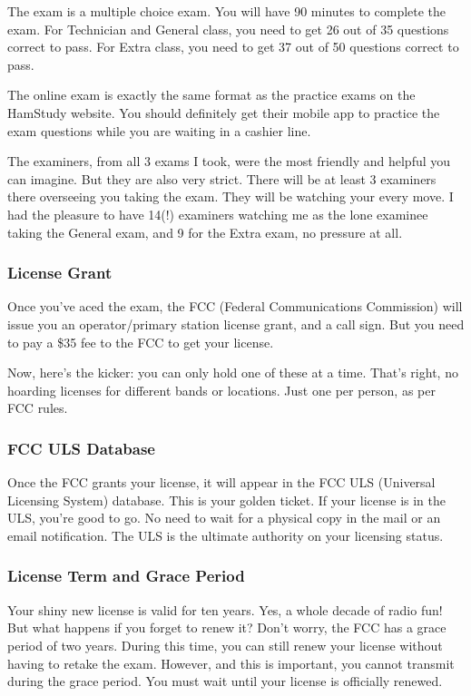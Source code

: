 The exam is a multiple choice exam. You will have 90 minutes to complete the exam. For Technician and General class, you need to get 26  out of 35 questions correct to pass. For Extra class, you need to get 37 out of 50 questions correct to pass. 

The online exam is exactly the same format as the practice exams on the HamStudy website. You should definitely get their mobile app to practice the exam questions while you are waiting in a cashier line. 

The examiners, from all 3 exams I took, were the most friendly and helpful you can imagine. But they are also very strict. There will be at least 3 examiners there  overseeing you taking the exam. They will be watching your every move. I had the pleasure to have 14(!) examiners watching me as the lone examinee taking the General exam, and 9 for the Extra exam, no pressure at all. 


\subsubsection{License Grant}
Once you've aced the exam, the FCC (Federal Communications Commission) will issue you an operator/primary station license grant, and a call sign. But you need to pay a \$35 fee to the FCC to get your license. 

Now, here's the kicker: you can only hold one of these at a time. That's right, no hoarding licenses for different bands or locations. Just one per person, as per FCC rules.


\subsubsection{FCC ULS Database}
Once the FCC grants your license, it will appear in the FCC ULS (Universal Licensing System) database. This is your golden ticket. If your license is in the ULS, you're good to go. No need to wait for a physical copy in the mail or an email notification. The ULS is the ultimate authority on your licensing status.

\subsubsection*{License Term and Grace Period}
Your shiny new license is valid for ten years. Yes, a whole decade of radio fun! But what happens if you forget to renew it? Don't worry, the FCC has a grace period of two years. During this time, you can still renew your license without having to retake the exam. However, and this is important, you cannot transmit during the grace period. You must wait until your license is officially renewed.

